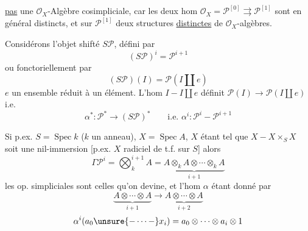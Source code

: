 \uline{pas} une $\mathcal O_X$-Algèbre cosimpliciale, car les deux hom
$\mathcal O_X=\mathcal P^{[0]}\rightrightarrows\mathcal P^{[1]}$
sont en général distincts, et  sur $\mathcal P^{[1]}$
deux structures \uline{distinctes} de $\mathcal O_X$-algèbres.

Considérons l'objet shifté $S\mathcal P$, défini par
\[
(S\mathcal P)^i=\mathcal P^{i+1}
\]
ou fonctoriellement par
\[
(S\mathcal P)(I)=\mathcal P(I\amalg e)
\]
$e$ un ensemble réduit à un élément.
L'hom  $I-I\amalg e$ définit
$\mathcal P(I)\longrightarrow\mathcal P(I\amalg e)$ i.e.
\[
\alpha^*:\mathcal P^*\longrightarrow(S\mathcal P)^*
\qquad\text{i.e. }\alpha^i:\mathcal P^i-\mathcal P^{i+1}
\]

Si p.ex. $S=\operatorname{Spec}k$ ($k$ un anneau),
$X=\operatorname{Spec}A$, $X$ étant tel que $X-X\times_SX$
soit une nil-immersion [p.ex. $X$ radiciel de t.f. sur $S$]
alors 
\[
\Gamma\mathcal P^i=\bigotimes_k^{i+1}A
=\underbrace{A\otimes_k A\otimes\cdots\otimes_k A}_{i+1}
\]
les op. simpliciales sont celles qu'on devine, et l'hom $\alpha$
étant donné par
\[
\underbrace{A\otimes\cdots\otimes A}_{i+1}
\longrightarrow\underbrace{A\otimes\cdots\otimes A}_{i+2}
\]
\[
\alpha^i(a_0\unsure{-\cdots-}x_i)
=a_0\otimes\cdots\otimes a_i\otimes1
\]

